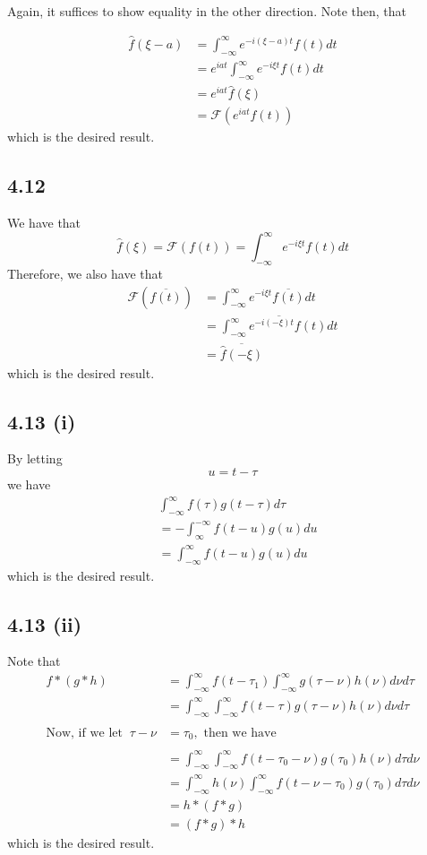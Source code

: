 \documentclass[letterpaper,12pt]{article}
\theoremstyle{definition}
\begin{document}
Again, it suffices to show equality in the other direction. Note then, that

\begin{align*}
    \hat f(\xi -a) & = \int ^\infty_{-\infty} e^{-i(\xi-a) t}f(t)dt \\
    & = e^{iat} \int ^\infty_{-\infty} e^{-i\xi t}f(t)dt \\
    & = e^{iat} \hat f(\xi) \\
    & = \mathscr{F}(e^{iat}f(t))
\end{align*}
        which is the desired result.

\subsection*{4.12}


We have that
\[\hat f(\xi) = \mathscr{F}(f(t)) = \int^\infty_{-\infty} e^{-i\xi t} f(t)dt\]
Therefore, we also have that
\begin{align*}
    \mathscr{F}(\overline{f(t)})&  = \int^\infty_{-\infty} e^{-i\xi t} \overline{f(t)}dt \\
    & = \overline{\int^\infty_{-\infty} e^{-i(-\xi) t} f(t)dt} \\
    & = \overline{\hat f(-\xi)}
\end{align*}
        which is the desired result.



\subsection*{4.13 (i)}
By letting \[u = t - \tau\]
we have
        \begin{align*}
            &\int^\infty_{-\infty} f(\tau)g(t-\tau)d\tau \\
            & = -\int^{-\infty}_\infty f(t-u)g(u) du \\
            & = \int^\infty_{-\infty} f(t-u)g(u) du
        \end{align*}
        which is the desired result.
\subsection*{4.13 (ii)}
Note that
        \begin{align*}
            f*(g*h) & = \int_{-\infty}^\infty f(t-\tau_1) \int_{-\infty}^\infty g(\tau-\nu)h(\nu)d\nu d\tau \\
            & = \int_{-\infty}^\infty \int_{-\infty}^\infty f(t-\tau)g(\tau - \nu)h(\nu)d\nu d\tau \\
            \\
             \text{Now, if we let }~\tau - \nu &= \tau_0, \text{ then we have} \\
            \\
            & = \int_{-\infty}^\infty \int_{-\infty}^\infty f(t-\tau_0 - \nu)g(\tau_0)h(\nu) d\tau d\nu \\
            & = \int_{-\infty}^\infty h(\nu) \int_{-\infty}^\infty f(t-\nu - \tau_0)g(\tau_0) d\tau d\nu \\
            & = h * (f*g) \\
            & = (f * g) * h
        \end{align*}
        which is the desired result.
\end{document}
